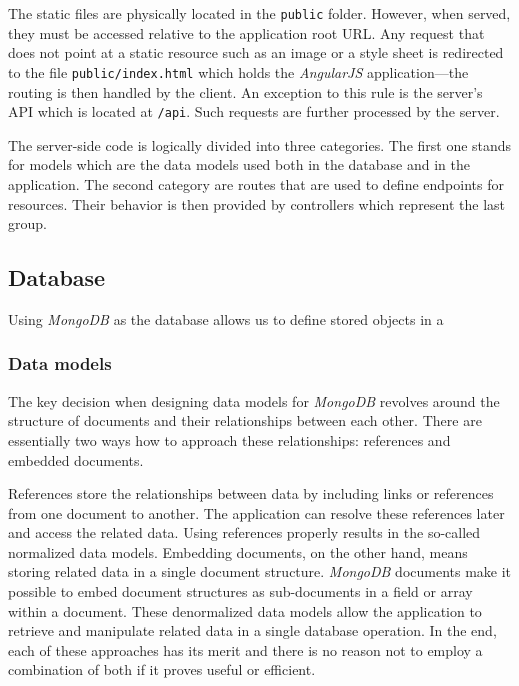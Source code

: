 \documentclass[thesis=M,english,hidelinks]{FITthesis}[2012/10/20]
\newcommand{\code}{\texttt}
\begin{document}
The static files are physically located in the \code{public} folder. However, when served, they must be accessed relative to the application root URL. Any request that does not point at a static resource such as an image or a style sheet is redirected to the file \code{public/index.html} which holds the \textit{AngularJS} application---the routing is then handled by the client. An exception to this rule is the server's API which is located at \code{/api}. Such requests are further processed by the server.

The server-side code is logically divided into three categories. The first one stands for models which are the data models used both in the database and in the application. The second category are routes that are used to define endpoints for resources. Their behavior is then provided by controllers which represent the last group.

    \subsection{Database}

Using \textit{MongoDB} as the database allows us to define stored objects in a \cite{mongoose}

      \subsubsection{Data models}

The key decision when designing data models for \textit{MongoDB} revolves around the structure of documents and their relationships between each other. There are essentially two ways how to approach these relationships: references and embedded documents.

References store the relationships between data by including links or references from one document to another. The application can resolve these references later and access the related data. Using references properly results in the so-called normalized data models. Embedding documents, on the other hand, means storing related data in a single document structure. \textit{MongoDB} documents make it possible to embed document structures as sub-documents in a field or array within a document. These denormalized data models allow the application to retrieve and manipulate related data in a single database operation. In the end, each of these approaches has its merit and there is no reason not to employ a combination of both if it proves useful or efficient.
\end{document}
